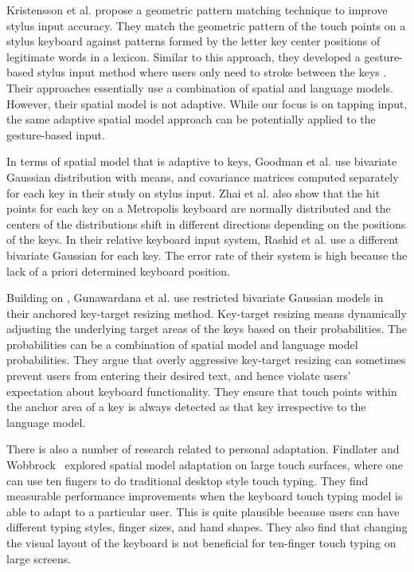 \documentclass{sigchi}
\begin{document}
Kristensson et al. \cite{Kristensson:2005} propose a geometric pattern matching technique to improve 
stylus input accuracy. They match the geometric pattern of the touch points on a stylus keyboard against patterns formed by 
the letter key center positions of legitimate words in a lexicon. Similar to this approach,
they developed a gesture-based stylus input method where users only need to stroke between the keys \cite{Kristensson:2004}.
Their approaches essentially use a combination of spatial and language models. However, 
their spatial model is not adaptive. While our focus is on tapping input, the same adaptive spatial model approach
can be potentially applied to the gesture-based input.

In terms of spatial model that is adaptive to keys, Goodman et al. \cite{Goodman:2002} use bivariate Gaussian distribution with means, and
covariance matrices computed separately for each key in their study on stylus input. Zhai et al. \cite{Zhai:2002} also show that
the hit points for each key on a Metropolis keyboard \cite{Zhai:2000} are normally distributed and 
the centers of the distributions shift in different directions depending on the positions of
the keys. In their relative keyboard input system, Rashid et al. \cite{Rashid:2008} use a different bivariate Gaussian for each key. The error rate of their system is high because the lack of 
a priori determined keyboard position.

Building on \cite{Goodman:2002}, Gunawardana et al. \cite{Gunawardana:2010} use restricted bivariate Gaussian
models in their anchored key-target resizing method. Key-target resizing means dynamically
adjusting the underlying target areas of the keys based on their probabilities. The probabilities can 
be a combination of spatial model and language model probabilities.
They argue that overly aggressive
key-target resizing can sometimes prevent users from entering their desired text, and hence violate
users' expectation about keyboard functionality. They ensure that touch points within
the anchor area of a key is always detected as that key irrespective to the language model.

There is also a number of research related to personal adaptation. Findlater and Wobbrock~\cite{Findlater:2012} explored spatial model adaptation on large touch surfaces, where one can use ten fingers to do traditional desktop style touch typing. They find measurable performance improvements when the keyboard touch typing model is able to adapt to a particular user. This is quite plausible because users can have different typing styles, finger sizes, and hand shapes. They also find that changing the visual layout of the keyboard is not beneficial for ten-finger touch typing on large screens.
\end{document}
